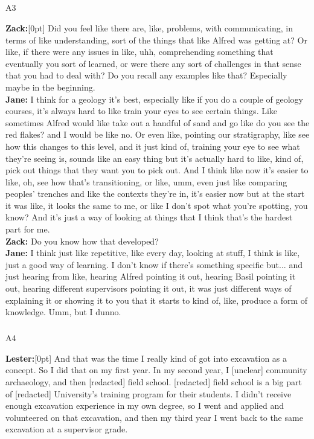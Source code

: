 \documentclass[
]{article}
\makeatletter
\let\oldsubparagraph\subparagraph
\renewcommand{\subparagraph}{
    \@ifstar
      \xxxSubParagraphStar
      \xxxSubParagraphNoStar
  }
\newcommand{\xxxSubParagraphStar}[1]{\oldsubparagraph*{#1}\mbox{}}
\newcommand{\xxxSubParagraphNoStar}[1]{\oldsubparagraph{#1}\mbox{}}
\newcommand{\paragraphnumber}[1]{\marginnote{\color{lightgray}\tiny{#1}}[0pt]}
\makeatother
\begin{document}
\subparagraph{A3}\label{sec-A3}

\textbf{Zack:}\paragraphnumber{[54]} Did you feel like there are, like,
problems, with communicating, in terms of like understanding, sort of
the things that like Alfred was getting at? Or like, if there were any
issues in like, uhh, comprehending something that eventually you sort of
learned, or were there any sort of challenges in that sense that you had
to deal with? Do you recall any examples like that? Especially maybe in
the beginning.\\
\textbf{Jane:} I think for a geology it's best, especially like if you
do a couple of geology courses, it's always hard to like train your eyes
to see certain things. Like sometimes Alfred would like take out a
handful of sand and go like do you see the red flakes? and I would be
like no. Or even like, pointing our stratigraphy, like see how this
changes to this level, and it just kind of, training your eye to see
what they're seeing is, sounds like an easy thing but it's actually hard
to like, kind of, pick out things that they want you to pick out. And I
think like now it's easier to like, oh, see how that's transitioning, or
like, umm, even just like comparing peoples' trenches and like the
contexts they're in, it's easier now but at the start it was like, it
looks the same to me, or like I don't spot what you're spotting, you
know? And it's just a way of looking at things that I think that's the
hardest part for me.\\
\textbf{Zack:} Do you know how that developed?\\
\textbf{Jane:} I think just like repetitive, like every day, looking at
stuff, I think is like, just a good way of learning. I don't know if
there's something specific but... and just hearing from like, hearing
Alfred pointing it out, hearing Basil pointing it out, hearing different
supervisors pointing it out, it was just different ways of explaining it
or showing it to you that it starts to kind of, like, produce a form of
knowledge. Umm, but I dunno.

\subparagraph{A4}\label{sec-A4}

\textbf{Lester:}\paragraphnumber{[55]} And that was the time I really
kind of got into excavation as a concept. So I did that on my first
year. In my second year, I {[}unclear{]} community archaeology, and then
{[}redacted{]} field school. {[}redacted{]} field school is a big part
of {[}redacted{]} University's training program for their students. I
didn't receive enough excavation experience in my own degree, so I went
and applied and volunteered on that excavation, and then my third year I
went back to the same excavation at a supervisor grade.
\end{document}
